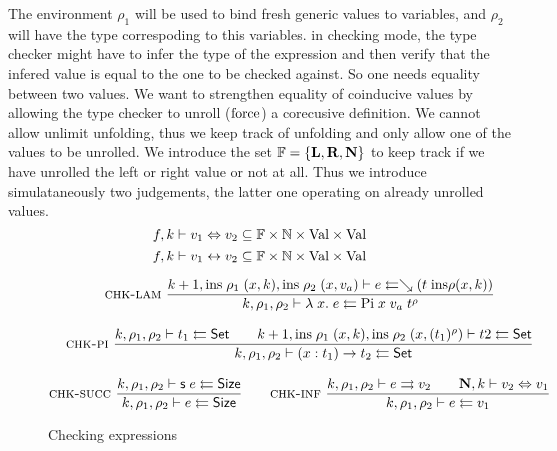 The environment $\rho_1$ will be used to bind fresh generic values to variables, and $\rho_2$ will have the type correspoding to this variables. in checking mode, the type checker might have to infer the type of the expression and then verify that the infered value is equal to the one to be checked against.
So one needs equality between two values.
We want to strengthen equality of coinducive values by allowing the type checker to unroll ($\mathrm{force}$) a corecusive definition. We cannot allow unlimit unfolding, thus we keep track of unfolding and only allow one of the values to be unrolled.
We introduce the set $ \mathbb{F} = \{\mathbf{L}, \mathbf{R}, \mathbf{N} \} $ to keep track if we have unrolled the left or right value or not at all.
Thus we introduce simulataneously two judgements, the latter one operating on already unrolled values.
\[f,k\vdash v_1\Leftrightarrow v_2 \subseteq \mathbb{F} \times \mathbb{N} \times \mathrm{Val} \times \mathrm{Val} \]
\[f,k\vdash v_1{\;\leftrightarrow\;}v_2 \subseteq \mathbb{F} \times \mathbb{N} \times\mathrm{Val} \times \mathrm{Val} \]

\begin{figure}[p]

\begin{gather*}
\mbox{\sc chk-lam}\ \dfrac{k+1,\mathrm{ins} \; \rho_1 \; (x,k),\mathrm{ins} \; \rho_2 \; (x,v_a)\vdash e\leftleftarrows\searrow (t \; \mathrm{ins} \rho (x,k))}{k,\rho_1,\rho_2\vdash\lambda\; x .\;{e}\leftleftarrows\mathrm{Pi} \; x \; v_a \; t^{\rho}}
\\[2ex]
\mbox{\sc chk-pi}\ \dfrac{k,\rho_1,\rho_2\vdash t_1\leftleftarrows\mathsf{Set}
\qquad
k+1,\mathrm{ins} \; \rho_1 \; (x,k),\mathrm{ins} \; \rho_2 \; (x,(t_1)^{\rho})\vdash t2\leftleftarrows\mathsf{Set}
}{k,\rho_1,\rho_2\vdash( x : t_1 ) \rightarrow{t_2}\leftleftarrows\mathsf{Set}}
\\[2ex]
\mbox{\sc chk-succ}\ \dfrac{k,\rho_1,\rho_2\vdash\mathsf{s}\; e\leftleftarrows\mathsf{Size}}{k,\rho_1,\rho_2\vdash e\leftleftarrows\mathsf{Size}}
\qquad
\mbox{\sc chk-inf}\ \dfrac{k,\rho_1,\rho_2\vdash e\rightrightarrows v_2
\qquad
\mathbf{N},k\vdash v_2\Leftrightarrow v_1}{k,\rho_1,\rho_2\vdash e\leftleftarrows v_1}
\end{gather*}
\caption{Checking expressions}
\end{figure}

